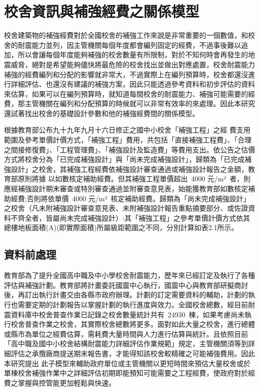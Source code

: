 \renewcommand\thetable{\arabic{chapter}-\arabic{table}}
\chapter{校舍資訊與補強經費之關係模型}

校舍建築物的補強經費對於全國校舍的補強工作來說是非常重要的一個數值，和校舍的耐震能力並列，因主管機關每個年度都會編列固定的經費，不過事後難以追加，所以會讓每個年度能夠補強的校舍數量有所限制，對於不知何時會再發生的地震威脅，絕對是希望能夠儘快將最危險的校舍找出並做出對應處置，校舍耐震能力補強的經費編列和分配的影響就非常大，不過實際上在編列預算時，校舍都還沒進行詳細評估、也還沒有建議的補強方案，因此只能透過參考資料和初步評估的資料來估算，如果可以在編列預算時，就知道每間校舍的耐震能力、補強可能需要的經費，那主管機關在編列和分配預算的時候就可以非常有效率的來處理。因此本研究還試著找出校舍的基礎設計參數和他的補強經費間的關係模型。

根據教育部公布九十九年九月十六日修正之國中小校舍「補強工程」之經 費支用範圍及參考單價計價方式，「補強工程」費用，共包括「直接補強工程費」、「合理之間接修復費」、「工程管理費」、「補強設計及監造費」等費用支出。依公告之估價方式將校舍分為「已完成補強設計」與「尚未完成補強設計」，歸類為「已完成補強設計」之校舍，其補強工程經費依補強設計審查通過或補強設計報告之金額，教育部原則將據 以如數核定補助經費。但其補強工程單價超出~4000 元/m²~者，則應經補強設計期末審查或特別審查通過並附審查意見表，始能獲教育部如數核定補助經費;否則將依單價~4000 元/m²~核定補助經費。歸類為「尚未完成補強設計」之校舍（凡未附補強設計審查意見表、未附補強設計報告重點摘要部分、或佐證資料不齊全者，皆屬尚未完成補強設計）:其「補強工程」之參考單價計價方式依其總樓地板面積(A)(即實際面積)所屬級距範圍之不同，分別計算如表2.1所示。

\section{資料前處理}

教育部為了提升全國高中職及中小學校舍耐震能力，歷年來已經訂定及執行了各種評估與補強計劃。教育部將計畫委託國震中心執行，國震中心與教育部研擬商討後，再訂出執行計畫交由各縣市政府辦理。計劃的訂定需要資料的輔助，計劃的執行也需要定期的計劃報告以掌握計劃的執行進度與效力。全國校舍總數，經目前耐震資料庫中校舍普查作業已記錄之校舍數量統計共有~24930~棟，如果考慮尚未執行校舍普查作業之校舍，其實際校舍總數將更多。面對如此大量之校舍，進行總體或縣市為單位之經費估算，需耗費大量時間與人力進行估算與統計。且依照目前「高中職及國中小校舍結構耐震能力詳細評估作業規範」規定，主管機關須等到詳細評估之承攬廠商提送期末報告書，才能得知該校舍較精確之可能補強費用。因此本研究提出 此子模型來輔助政府單位或主管機關以更短時間來預估大量校舍或於單棟校舍補強作業中之詳細評估初期即能預知可能需要之工程經費，使政府對於經費之掌握與控管能更加輕鬆與快速。

